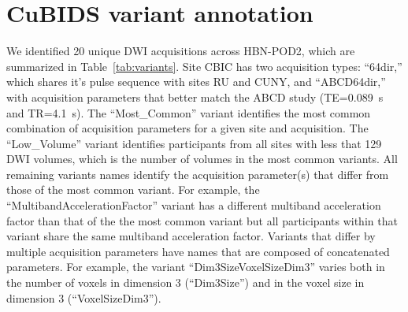 \documentclass[9pt,lineno]{elife}
\begin{document}
\appendix
\begin{appendixbox}
\label{app:variants}
\section{CuBIDS variant annotation}

We identified 20 unique DWI acquisitions across HBN-POD2, which are summarized in Table~\ref{tab:variants}. Site CBIC has two acquisition types: ``64dir,'' which shares it's pulse sequence with sites RU and CUNY, and ``ABCD64dir,'' with acquisition parameters that better match the ABCD study (TE=\qty{0.089}{\second} and TR=\qty{4.1}{\second}). The ``Most\_Common'' variant identifies the most common combination of acquisition parameters for a given site and acquisition. The ``Low\_Volume'' variant identifies participants from all sites with less that 129 DWI volumes, which is the number of volumes in the most common variants. All remaining variants names identify the acquisition parameter(s) that differ from those of the most common variant. For example, the ``MultibandAccelerationFactor'' variant has a different multiband acceleration factor than that of the the most common variant but all participants within that variant share the same multiband acceleration factor. Variants that differ by multiple acquisition parameters have names that are composed of concatenated parameters. For example, the variant ``Dim3SizeVoxelSizeDim3'' varies both in the number of voxels in dimension 3 (``Dim3Size'') and in the voxel size in dimension 3 (``VoxelSizeDim3'').



\end{appendixbox}
\end{document}
